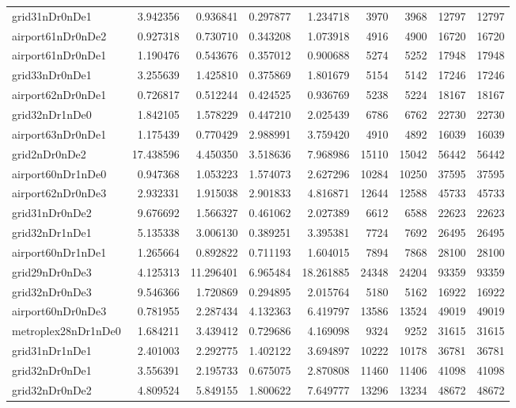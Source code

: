 \begin{longtable}{|l|r|r|r|r|r|r|r|r|}
grid31nDr0nDe1 & 3.942356 & 0.936841 & 0.297877 & 1.234718 & 3970 & 3968 & 12797 & 12797 \\
airport61nDr0nDe2 & 0.927318 & 0.730710 & 0.343208 & 1.073918 & 4916 & 4900 & 16720 & 16720 \\
airport61nDr0nDe1 & 1.190476 & 0.543676 & 0.357012 & 0.900688 & 5274 & 5252 & 17948 & 17948 \\
grid33nDr0nDe1 & 3.255639 & 1.425810 & 0.375869 & 1.801679 & 5154 & 5142 & 17246 & 17246 \\
airport62nDr0nDe1 & 0.726817 & 0.512244 & 0.424525 & 0.936769 & 5238 & 5224 & 18167 & 18167 \\
grid32nDr1nDe0 & 1.842105 & 1.578229 & 0.447210 & 2.025439 & 6786 & 6762 & 22730 & 22730 \\
airport63nDr0nDe1 & 1.175439 & 0.770429 & 2.988991 & 3.759420 & 4910 & 4892 & 16039 & 16039 \\
grid2nDr0nDe2 & 17.438596 & 4.450350 & 3.518636 & 7.968986 & 15110 & 15042 & 56442 & 56442 \\
airport60nDr1nDe0 & 0.947368 & 1.053223 & 1.574073 & 2.627296 & 10284 & 10250 & 37595 & 37595 \\
airport62nDr0nDe3 & 2.932331 & 1.915038 & 2.901833 & 4.816871 & 12644 & 12588 & 45733 & 45733 \\
grid31nDr0nDe2 & 9.676692 & 1.566327 & 0.461062 & 2.027389 & 6612 & 6588 & 22623 & 22623 \\
grid32nDr1nDe1 & 5.135338 & 3.006130 & 0.389251 & 3.395381 & 7724 & 7692 & 26495 & 26495 \\
airport60nDr1nDe1 & 1.265664 & 0.892822 & 0.711193 & 1.604015 & 7894 & 7868 & 28100 & 28100 \\
grid29nDr0nDe3 & 4.125313 & 11.296401 & 6.965484 & 18.261885 & 24348 & 24204 & 93359 & 93359 \\
grid32nDr0nDe3 & 9.546366 & 1.720869 & 0.294895 & 2.015764 & 5180 & 5162 & 16922 & 16922 \\
airport60nDr0nDe3 & 0.781955 & 2.287434 & 4.132363 & 6.419797 & 13586 & 13524 & 49019 & 49019 \\
metroplex28nDr1nDe0 & 1.684211 & 3.439412 & 0.729686 & 4.169098 & 9324 & 9252 & 31615 & 31615 \\
grid31nDr1nDe1 & 2.401003 & 2.292775 & 1.402122 & 3.694897 & 10222 & 10178 & 36781 & 36781 \\
grid32nDr0nDe1 & 3.556391 & 2.195733 & 0.675075 & 2.870808 & 11460 & 11406 & 41098 & 41098 \\
grid32nDr0nDe2 & 4.809524 & 5.849155 & 1.800622 & 7.649777 & 13296 & 13234 & 48672 & 48672 \\

\end{longtable}
